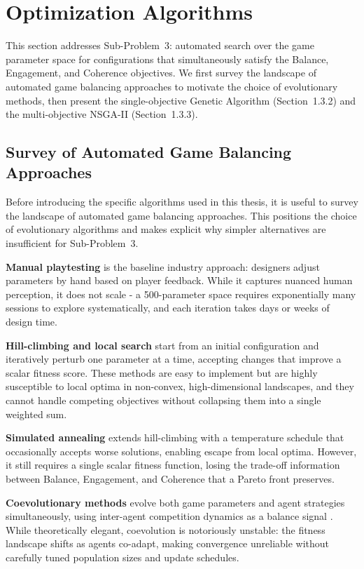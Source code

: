 \section{Optimization Algorithms}

This section addresses Sub-Problem~3: automated search over the game parameter space for configurations that simultaneously satisfy the Balance, Engagement, and Coherence objectives. We first survey the landscape of automated game balancing approaches to motivate the choice of evolutionary methods, then present the single-objective Genetic Algorithm (Section~1.3.2) and the multi-objective NSGA-II (Section~1.3.3).

\subsection{Survey of Automated Game Balancing Approaches}

Before introducing the specific algorithms used in this thesis, it is useful to survey the landscape of automated game balancing approaches. This positions the choice of evolutionary algorithms and makes explicit why simpler alternatives are insufficient for Sub-Problem~3.

\textbf{Manual playtesting} is the baseline industry approach: designers adjust parameters by hand based on player feedback. While it captures nuanced human perception, it does not scale - a 500-parameter space requires exponentially many sessions to explore systematically, and each iteration takes days or weeks of design time.

\textbf{Hill-climbing and local search} start from an initial configuration and iteratively perturb one parameter at a time, accepting changes that improve a scalar fitness score. These methods are easy to implement but are highly susceptible to local optima in non-convex, high-dimensional landscapes, and they cannot handle competing objectives without collapsing them into a single weighted sum.

\textbf{Simulated annealing} extends hill-climbing with a temperature schedule that occasionally accepts worse solutions, enabling escape from local optima. However, it still requires a single scalar fitness function, losing the trade-off information between Balance, Engagement, and Coherence that a Pareto front preserves.

\textbf{Coevolutionary methods} evolve both game parameters and agent strategies simultaneously, using inter-agent competition dynamics as a balance signal \cite{nelson2007towards}. While theoretically elegant, coevolution is notoriously unstable: the fitness landscape shifts as agents co-adapt, making convergence unreliable without carefully tuned population sizes and update schedules.

